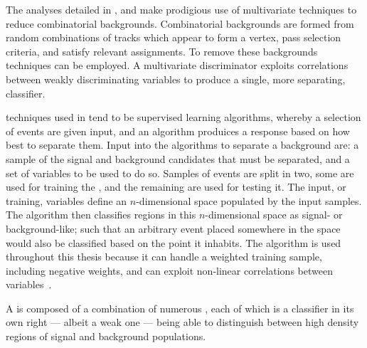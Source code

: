 The analyses detailed in ,  and  make
prodigious use of multivariate techniques to reduce combinatorial backgrounds.
Combinatorial backgrounds are formed from random combinations of tracks which appear to form a
vertex, pass selection criteria, and satisfy relevant \pid assignments.
To remove these backgrounds \MVA techniques can be employed.
A multivariate discriminator exploits correlations between weakly discriminating variables to
produce a single, more separating, classifier.


\MVA techniques used in \HEP tend to be supervised learning algorithms, whereby a selection of
events are given input, and an algorithm produices a response based on how best to separate them.
Input into the algorithms to separate a background are:
a sample of the signal and background candidates that must be
separated, and a set of variables to be used to do so.
Samples of events are split in two, some are used for training the \MVA, and the remaining are used
for testing it.
The input, or training, variables define an $n$-dimensional space populated by the input samples.
The algorithm then classifies regions in this $n$-dimensional space as signal- or background-like;
such that an arbitrary event placed somewhere in the space would also be classified based on the
point it inhabits.
The \BDT algorithm is used throughout this thesis because it can handle
a weighted training sample, including negative weights, and can exploit non-linear correlations
between variables~\cite{Breiman,Roe}.

A \BDT is composed of a combination of numerous \DTs, each of which is a classifier
in its own right
--- albeit a weak one ---
being able to distinguish between high density regions of signal and
background populations.

